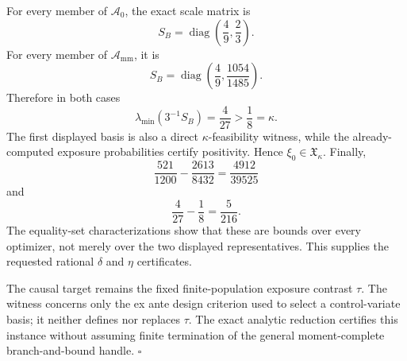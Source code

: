 For every member of \(\mathcal A_0\), the exact scale matrix is
\[
S_B=\operatorname{diag}\!\left(\frac49,\frac23\right).
\]
For every member of \(\mathcal A_{\mathrm{mm}}\), it is
\[
S_B=\operatorname{diag}\!\left(\frac49,\frac{1054}{1485}\right).
\]
Therefore in both cases
\[
\lambda_{\min}(3^{-1}S_B)=\frac4{27}>\frac18=\kappa.
\]
The first displayed basis is also a direct \(\kappa\)-feasibility witness, while the already-computed exposure probabilities certify positivity.  Hence \(\xi_0\in\mathfrak X_\kappa\).  Finally,
\[
\frac{521}{1200}-\frac{2613}{8432}=\frac{4912}{39525}
\]
and
\[
\frac4{27}-\frac18=\frac5{216}.
\]
The equality-set characterizations show that these are bounds over every optimizer, not merely over the two displayed representatives.  This supplies the requested rational \(\delta\) and \(\eta\) certificates.

The causal target remains the fixed finite-population exposure contrast \(\tau\).  The witness concerns only the ex ante design criterion used to select a control-variate basis; it neither defines nor replaces \(\tau\).  The exact analytic reduction certifies this instance without assuming finite termination of the general moment-complete branch-and-bound handle. \(\square\)